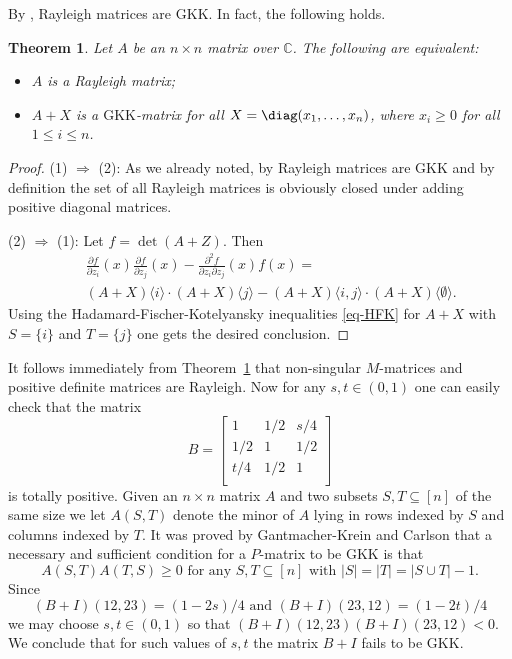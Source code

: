 \documentclass[10pt,reqno]{amsart}
\theoremstyle{plain}
\newtheorem{theorem}{Theorem}[section]
\theoremstyle{definition}
\theoremstyle{remark}
\newcommand{\GKK}{\text{GKK}}
\newcommand{\CC}{\mathbb{C}}
\begin{document}
By \cite[Theorem 4.4]{W}, 
Rayleigh matrices are $\GKK$. In fact, the following holds.

\begin{theorem}\label{R-matrix}
Let $A$ be an $n \times n$ matrix over $\CC$. The following are equivalent:
\begin{itemize}
\item[(1)] $A$ is a Rayleigh matrix;
\item[(2)] $A+X$ is a $\GKK$-matrix for all $X=\diag(x_1,\ldots, x_n)$,
where $x_i \geq 0$ for all $1\leq i \leq n$.
\end{itemize}
\end{theorem}

\begin{proof}
(1) $\Rightarrow$ (2): As we already noted, by \cite[Theorem~4.4]{W} 
Rayleigh matrices are $\GKK$ and by definition the set of all Rayleigh 
matrices is obviously closed under adding positive diagonal matrices.

(2) $\Rightarrow$ (1): Let $f=\det(A+Z)$. Then
\begin{eqnarray*}
&& \frac {\partial f} {\partial z_i}(x) \frac {\partial f} {\partial z_j}(x)
- \frac {\partial^2 f} {\partial z_i \partial z_j}(x) f(x) =\\
&& (A+X)\langle i \rangle \cdot (A+X)\langle j \rangle - (A+X)\langle i,j
\rangle \cdot (A+X)\langle\emptyset \rangle.
\end{eqnarray*}
Using the Hadamard-Fischer-Kotelyansky inequalities \eqref{eq-HFK} for $A+X$ 
with $S=\{i\}$ and $T=\{j\}$ one gets the desired conclusion.
\end{proof}

It follows immediately from  Theorem~\ref{R-matrix} that non-singular
$M$-matrices and positive definite matrices are Rayleigh. Now 
for any $s,t\in(0,1)$ one can easily check that the matrix 
\begin{equation}\label{b-mat}
B=
 \left[\begin{array}{ccc}
 1 & 1/2 & s/4 \\
 1/2 & 1 & 1/2 \\
 t/4 & 1/2 & 1 \\ \end{array} \right]
\end{equation}
 is totally positive.
Given an $n\times n$ matrix $A$ and two subsets $S, T \subseteq [n]$ of the
same size we let $A(S,T)$ denote the minor of $A$ lying in rows indexed by 
$S$ and columns indexed by $T$. It was proved by Gantmacher-Krein \cite{GK} 
and Carlson \cite{Ca}
that a  necessary and sufficient condition for a $P$-matrix to be $\GKK$
is that
$$
A(S,T)A(T,S) \geq 0\text{ for any }S,T \subseteq [n]\text{ with } 
|S|=|T|=|S\cup T|-1.
$$
Since
$$
(B+I)(12,23)= ( 1-2s)/4\text{ and } (B+I)(23,12)=(1-2t)/4
$$
we may choose $s,t\in (0,1)$ so that 
$(B+I)(12,23)(B+I)(23,12)<0$. We conclude that
for such values of $s,t$ the matrix  $B+I$ fails to be $\GKK$.
\end{document}
